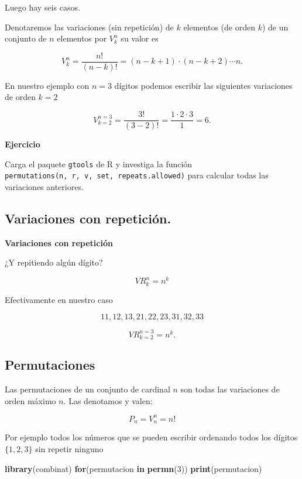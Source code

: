 \documentclass[]{book}
\newenvironment{Shaded}{\begin{snugshade}}{\end{snugshade}}
\newcommand{\ControlFlowTok}[1]{\textcolor[rgb]{0.13,0.29,0.53}{\textbf{#1}}}
\newcommand{\DecValTok}[1]{\textcolor[rgb]{0.00,0.00,0.81}{#1}}
\newcommand{\KeywordTok}[1]{\textcolor[rgb]{0.13,0.29,0.53}{\textbf{#1}}}
\newcommand{\NormalTok}[1]{#1}
\begin{document}
Luego hay seis casos.

Denotaremos las variaciones (sin repetición) de \(k\) elementos (de orden \(k\)) de un conjunto de \(n\) elementos por \(V^n_k\) su valor es

\[
V^n_k=\frac{n!}{(n-k)!}=(n-k+1)\cdot (n-k+2)\cdots n.
\]

En nuestro ejemplo con \(n=3\) dígitos podemos escribir las siguientes variaciones de orden \(k=2\)

\[
V_{k=2}^{n=3}=\frac{3!}{(3-2)!}=\frac{1\cdot 2\cdot 3}{1}=6.
\]

\textbf{Ejercicio}

Carga el paquete \texttt{gtools} de R y investiga la función \texttt{permutations(n,\ r,\ v,\ set,\ repeats.allowed)} para calcular todas las variaciones anteriores.

\hypertarget{variaciones-con-repeticiuxf3n.}{%
\subsection{Variaciones con repetición.}\label{variaciones-con-repeticiuxf3n.}}

\textbf{Variaciones con repetición}

¿Y repitiendo algún dígito?

\[VR^n_k=n^k\]

Efectivamente en nuestro caso

\[11,12,13,21,22,23,31,32,33\]

\[
VR_{k=2}^{n=3}=n^k.
\]

\hypertarget{permutaciones}{%
\subsection{Permutaciones}\label{permutaciones}}

Las permutaciones de un conjunto de cardinal \(n\) son todas las variaciones de orden máximo \(n\).
Las denotamos y valen:

\[
P_n=V_n^n=n!
\]

Por ejemplo todos los números que se pueden escribir ordenando todos los dígitos \(\{1,2,3\}\) sin repetir ninguno

\begin{Shaded}
\begin{Highlighting}[]
\KeywordTok{library}\NormalTok{(combinat)}
\ControlFlowTok{for}\NormalTok{(permutacion }\ControlFlowTok{in} \KeywordTok{permn}\NormalTok{(}\DecValTok{3}\NormalTok{)) }\KeywordTok{print}\NormalTok{(permutacion)}
\end{Highlighting}
\end{Shaded}
\end{document}
